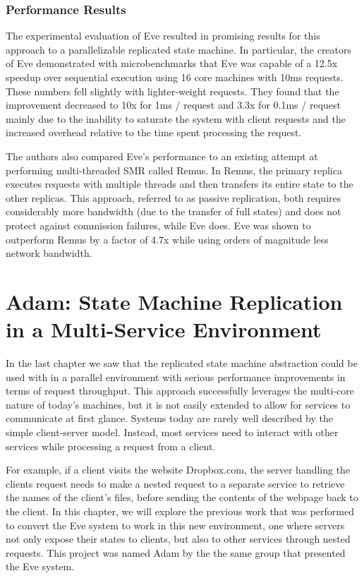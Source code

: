 \documentclass[11pt, oneside]{report}
\begin{document}
\subsection{Performance Results}

The experimental evaluation of Eve resulted in promising results for this approach to a parallelizable replicated state machine. In particular, the creators of Eve demonstrated with microbenchmarks that Eve was capable of a 12.5x speedup over sequential execution using 16 core machines with 10ms requests. These numbers fell slightly with lighter-weight requests. They found that the improvement decreased to 10x for 1ms / request and 3.3x for 0.1ms / request mainly due to the inability to saturate the system with client requests and the increased overhead relative to the time spent processing the request.

The authors also compared Eve's performance to an existing attempt at performing multi-threaded SMR called Remus. In Remus, the primary replica executes requests with multiple threads and then transfers its entire state to the other replicas. This approach, referred to as passive replication, both requires considerably more bandwidth (due to the transfer of full states) and does not protect against commission failures, while Eve does. Eve was shown to outperform Remus by a factor of 4.7x while using orders of magnitude less network bandwidth.

\chapter{Adam: State Machine Replication in a Multi-Service Environment}

In the last chapter we saw that the replicated state machine abstraction could be used with in a parallel environment with serious performance improvements in terms of request throughput. This approach successfully leverages the multi-core nature of today's machines, but it is not easily extended to allow for services to communicate at first glance. Systems today are rarely well described by the simple client-server model. Instead, most services need to interact with other services while processing a request from a client. 

For example, if a client visits the website Dropbox.com, the server handling the clients request needs to make a nested request to a separate service to retrieve the names of the client's files, before sending the contents of the webpage back to the client. In this chapter, we will explore the previous work that was performed to convert the Eve system to work in this new environment, one where servers not only expose their states to clients, but also to other services through nested requests. This project was named Adam by the the same group that presented the Eve system.
\end{document}
